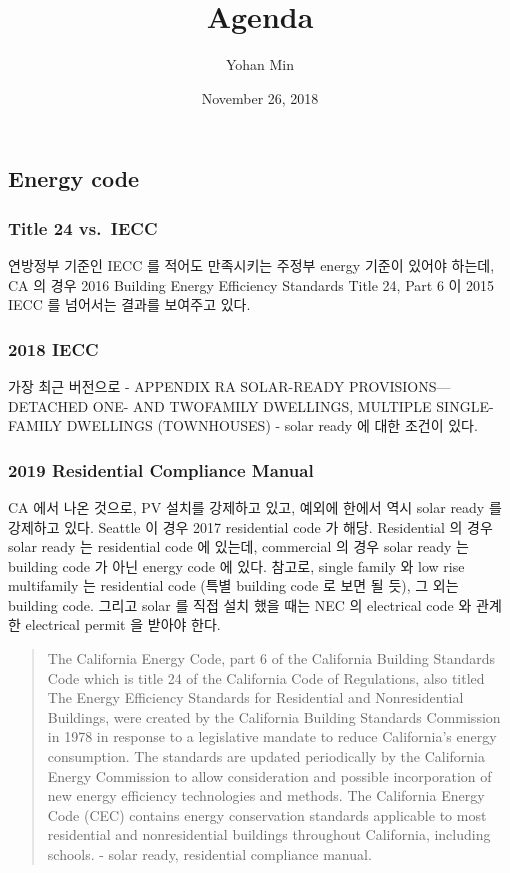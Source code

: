 \documentclass[]{article}
\title{Agenda}
\author{Yohan Min}
\date{November 26, 2018}
\begin{document}
\maketitle

{
\setcounter{tocdepth}{2}
\tableofcontents
}
\subsection{Energy code}\label{energy-code}

\subsubsection{Title 24 vs.~IECC}\label{title-24-vs.iecc}

연방정부 기준인 IECC 를 적어도 만족시키는 주정부 energy 기준이 있어야
하는데, CA 의 경우 2016 Building Energy Efficiency Standards Title 24,
Part 6 이 2015 IECC 를 넘어서는 결과를 보여주고 있다.

\subsubsection{2018 IECC}\label{iecc}

가장 최근 버전으로 - APPENDIX RA SOLAR-READY PROVISIONS---DETACHED ONE-
AND TWOFAMILY DWELLINGS, MULTIPLE SINGLE-FAMILY DWELLINGS (TOWNHOUSES) -
solar ready 에 대한 조건이 있다.

\subsubsection{2019 Residential Compliance
Manual}\label{residential-compliance-manual}

CA 에서 나온 것으로, PV 설치를 강제하고 있고, 예외에 한에서 역시 solar
ready 를 강제하고 있다. Seattle 이 경우 2017 residential code 가 해당.
Residential 의 경우 solar ready 는 residential code 에 있는데,
commercial 의 경우 solar ready 는 building code 가 아닌 energy code 에
있다. 참고로, single family 와 low rise multifamily 는 residential code
(특별 building code 로 보면 될 듯), 그 외는 building code. 그리고 solar
를 직접 설치 했을 때는 NEC 의 electrical code 와 관계한 electrical
permit 을 받아야 한다.

\begin{quote}
The California Energy Code, part 6 of the California Building Standards
Code which is title 24 of the California Code of Regulations, also
titled The Energy Efficiency Standards for Residential and
Nonresidential Buildings, were created by the California Building
Standards Commission in 1978 in response to a legislative mandate to
reduce California's energy consumption. The standards are updated
periodically by the California Energy Commission to allow consideration
and possible incorporation of new energy efficiency technologies and
methods. The California Energy Code (CEC) contains energy conservation
standards applicable to most residential and nonresidential buildings
throughout California, including schools. - solar ready, residential
compliance manual.
\end{quote}
\end{document}
